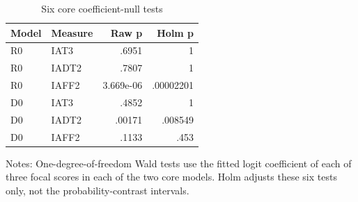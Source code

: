 \begin{table}[tbp]\centering
\caption{Six core coefficient-null tests}\label{tab:det-wald}
\begin{tabular}{llrr}\toprule Model & Measure & Raw p & Holm p \\
\midrule
R0 & IAT3 &      .6951 &          1 \\
R0 & IADT2 &      .7807 &          1 \\
R0 & IAFF2 &  3.669e-06 &  .00002201 \\
D0 & IAT3 &      .4852 &          1 \\
D0 & IADT2 &     .00171 &    .008549 \\
D0 & IAFF2 &      .1133 &       .453 \\
\bottomrule\end{tabular}
\par\smallskip\begin{minipage}{0.96\linewidth}\footnotesize\raggedright Notes: One-degree-of-freedom Wald tests use the fitted logit coefficient of each of three focal scores in each of the two core models. Holm adjusts these six tests only, not the probability-contrast intervals. \end{minipage}\end{table}
